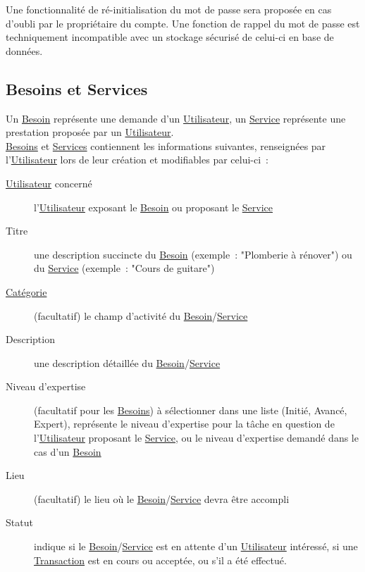 \documentclass[french]{article}
\begin{document}
			Une fonctionnalité de ré-initialisation du mot de passe sera proposée en
			 cas d’oubli par le propriétaire du compte. Une fonction de rappel du mot
			 de passe est techniquement incompatible avec un stockage sécurisé de
			 celui-ci en base de données.
			
		\newpage
		\subsection{Besoins et Services}
			Un \hyperlink{besoin}{Besoin} représente une demande d’un
			 \hyperlink{utilisateur}{Utilisateur}, un \hyperlink{service}{Service}
			 représente une prestation proposée par un
			 \hyperlink{utilisateur}{Utilisateur}.\\
			
			\hyperlink{besoin}{Besoins} et \hyperlink{service}{Services} contiennent
			 les informations suivantes, renseignées par
			 l’\hyperlink{utilisateur}{Utilisateur} lors de leur création et
			 modifiables par celui-ci :
			\begin{description}
				\item [\hyperlink{utilisateur}{Utilisateur} concerné]
					l’\hyperlink{utilisateur}{Utilisateur} exposant le
					 \hyperlink{besoin}{Besoin} ou proposant le
					 \hyperlink{service}{Service}
				\item [Titre]
					une description succincte du \hyperlink{besoin}{Besoin} (exemple :
					 "Plomberie à rénover") ou du \hyperlink{service}{Service} (exemple :
					 "Cours de guitare")
				\item [\hyperlink{categorie}{Catégorie}]
					(facultatif) le champ d’activité du
					 \hyperlink{besoin}{Besoin}/\hyperlink{service}{Service}
				\item [Description]
					une description détaillée du
					 \hyperlink{besoin}{Besoin}/\hyperlink{service}{Service}
				\item [Niveau d’expertise]
					(facultatif pour les \hyperlink{besoin}{Besoins}) à sélectionner dans
					 une liste (Initié, Avancé, Expert), représente le niveau d’expertise
					 pour la tâche en question de l’\hyperlink{utilisateur}{Utilisateur}
					 proposant le \hyperlink{service}{Service}, ou le niveau d’expertise
					 demandé dans le cas d’un \hyperlink{besoin}{Besoin}
				\item [Lieu]
					(facultatif) le lieu où le
					 \hyperlink{besoin}{Besoin}/\hyperlink{service}{Service} devra être
					 accompli
				\item [Statut]
					indique si le \hyperlink{besoin}{Besoin}/\hyperlink{service}{Service}
					 est en attente d’un \hyperlink{utilisateur}{Utilisateur} intéressé,
					 si une \hyperlink{transaction}{Transaction} est en cours ou acceptée,
					 ou s’il a été effectué.
			\end{description}
			
\end{document}
